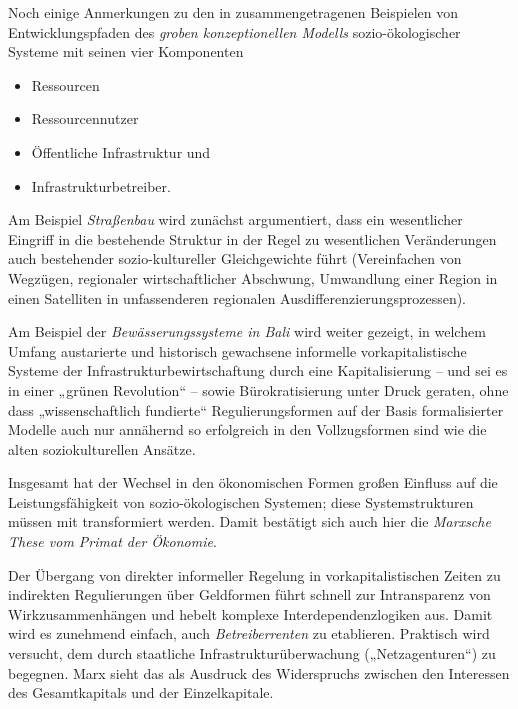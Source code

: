 \documentclass[11pt,a4paper]{article}
\begin{document}
Noch einige Anmerkungen zu den in \cite{Anderies2004} zusammengetragenen
Beispielen von Entwicklungspfaden des \emph{groben konzeptionellen Modells}
sozio-ökologischer Systeme mit seinen vier Komponenten
\begin{itemize}[noitemsep]
\item Ressourcen
\item Ressourcennutzer
\item Öffentliche Infrastruktur und
\item Infrastrukturbetreiber.
\end{itemize}

Am Beispiel \emph{Straßenbau} wird zunächst argumentiert, dass ein
wesentlicher Eingriff in die bestehende Struktur in der Regel zu wesentlichen
Veränderungen auch bestehender sozio-kultureller Gleichgewichte führt
(Vereinfachen von Wegzügen, regionaler wirtschaftlicher Abschwung, Umwandlung
einer Region in einen Satelliten in unfassenderen regionalen
Ausdifferenzierungsprozessen).

Am Beispiel der \emph{Bewässerungssysteme in Bali} wird weiter gezeigt, in
welchem Umfang austarierte und historisch gewachsene informelle
vorkapitalistische Systeme der Infrastrukturbewirtschaftung durch eine
Kapitalisierung -- und sei es in einer „grünen Revolution“ -- sowie
Bürokratisierung unter Druck geraten, ohne dass „wissenschaftlich fundierte“
Regulierungsformen auf der Basis formalisierter Modelle auch nur annähernd so
erfolgreich in den Vollzugsformen sind wie die alten soziokulturellen Ansätze.

Insgesamt hat der Wechsel in den ökonomischen Formen großen Einfluss auf die
Leistungs\-fähigkeit von sozio-ökologischen Systemen; diese Systemstrukturen
müssen mit transformiert werden. Damit bestätigt sich auch hier die
\emph{Marxsche These vom Primat der Ökonomie}.

Der Übergang von direkter informeller Regelung in vorkapitalistischen Zeiten
zu indirekten Regulierungen über Geldformen führt schnell zur Intransparenz
von Wirkzusammenhängen und hebelt komplexe Interdependenzlogiken aus. Damit
wird es zunehmend einfach, auch \emph{Betreiberrenten} zu etablieren.
Praktisch wird versucht, dem durch staatliche Infrastrukturüber\-wachung
(„Netzagenturen“) zu begegnen.  Marx sieht das als Ausdruck des Widerspruchs
zwischen den Interessen des Gesamtkapitals und der Einzelkapitale.
\end{document}
